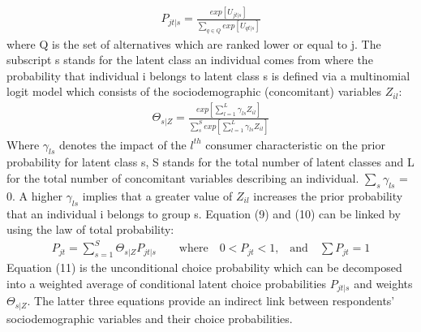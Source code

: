 \documentclass[12pt, abstracton]{article}
\begin{document}
\begin{align}
P_{jt|s} = \frac{exp[U_{jt|s}]}{\sum_{q \in Q} exp[U_{qt|s}]}
\end{align}
where Q is the set of alternatives which are ranked lower or equal to j. The subscript s stands for the latent class an individual comes from where the probability that individual i belongs to latent class s is defined via a multinomial logit model which consists of the sociodemographic (concomitant) variables \textit{$Z_{il}$}:
\begin{align}
\Theta_{s|Z} = \frac{exp[\sum_{l=1}^{L} \gamma_{ls}Z_{il}]}{\sum_{s}^{S}exp[{\sum_{l=1}^{L}\gamma_{ls}Z_{il}}]}
\end{align}
Where \textit{$\gamma_{ls}$} denotes the impact of the $l^{th}$ consumer characteristic on the prior probability for latent class s, S stands for the total number of latent classes and L for the total number of concomitant variables describing an individual. \textit{ $\sum_{s} \gamma_{ls}$} = 0. A higher \textit{$\gamma_{ls}$} implies that a greater value of \textit{ $Z_{il}$} increases the prior probability that an individual i belongs to group s. 
Equation (9) and (10) can be linked by using the law of total probability:
\begin{align}
P_{jt} = \sum_{s=1}^{S} \Theta_{s|Z} P_{jt|s} \qquad \text{where} \quad 0 < P_{jt} < 1 \text{,} \quad \text{and} \quad \sum P_{jt} = 1
\end{align} 
Equation (11) is the unconditional choice probability which can be decomposed into a weighted average of conditional latent choice probabilities \textit{$P_{jt|s}$} and weights \textit{$\Theta_{s|Z}$}. The latter three equations provide an indirect link between respondents’ sociodemographic variables and their choice probabilities. 
\end{document}
